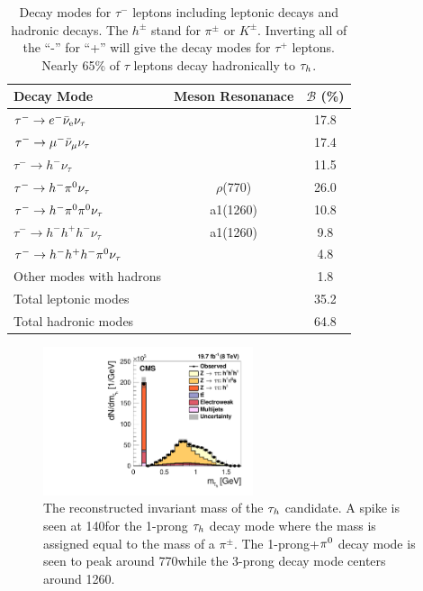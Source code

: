 \begin{table}[htbp]
\centering
\begin{tabular}{|l|cc|}
\hline
Decay Mode                                             &   Meson Resonanace     & $\mathcal{B}$ (\%) \\
\hline
$\tau^{-}  \to  e^{-}\bar{\nu}_{\text{e}}\nu_{\tau}$ &                        &     17.8  \\
$\tau^{-}  \to  \mu^{-}\bar{\nu}_{\mu}\nu_{\tau}$     &                        &     17.4  \\
$\tau^{-}  \to  h^{-}\nu_{\tau}$                       &                        &     11.5  \\
$\tau^{-}  \to  h^{-}\pi^{0}\nu_{\tau}$                  &      $\rho$(770)       &     26.0  \\
$\tau^{-}  \to  h^{-}\pi^{0}\pi^{0}\nu_{\tau}$             &      a1(1260)          &     10.8  \\
$\tau^{-}  \to  h^{-}h^{+}h^{-}\nu_{\tau}$             &      a1(1260)          &      9.8  \\
$\tau^{-}  \to  h^{-}h^{+}h^{-}\pi^{0}\nu_{\tau}$        &                        &      4.8  \\
Other modes with hadrons                               &                        &      1.8  \\
\hline
Total leptonic modes                                   &                        &     35.2  \\
Total hadronic modes                                   &                        &     64.8  \\
\hline
\end{tabular}
\label{tab:tau_dms}
\caption{
Decay modes for $\tau^{-}$ leptons including leptonic decays and hadronic decays. 
The $h^{\pm}$ stand for $\pi^{\pm}$ or $K^{\pm}$. Inverting all
of the ``-'' for ``+'' will give the decay modes for $\tau^{+}$ leptons. Nearly 65\% of $\tau$
leptons decay hadronically to $\tau_{h}$.
}
\end{table}

\begin{figure}[htbp]
\centering
     \includegraphics[width=0.55\textwidth]{object_reconstruction_and_selection/plots/CMS-TAU-14-001_tau_mass.pdf}
     \caption{
The reconstructed invariant mass of the $\tau_{h}$ candidate. A spike is seen at 140\MeV for the 1-prong
$\tau_{h}$ decay mode where the mass is assigned equal to the mass of a $\pi^{\pm}$. The 1-prong+$\pi^{0}$
decay mode is seen to peak around 770\MeV while the 3-prong decay mode centers around 1260\MeV.
     }
     \label{fig:tau_mass}
\end{figure}

